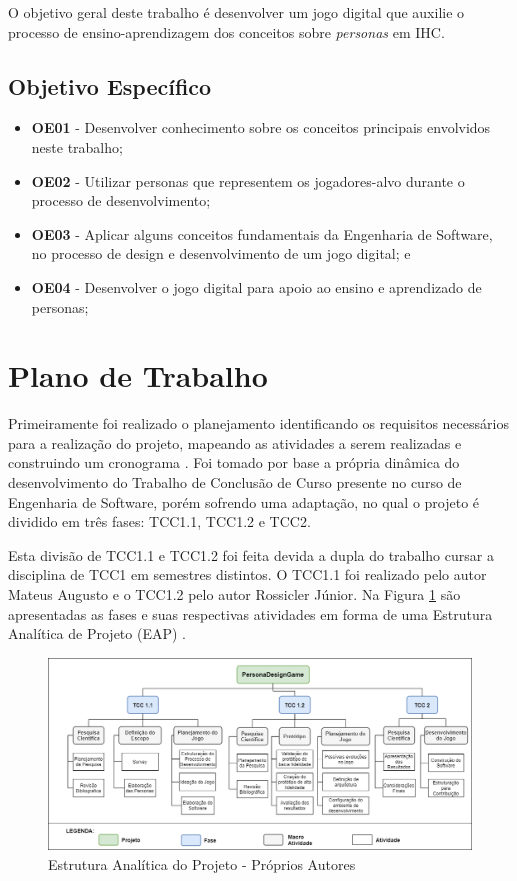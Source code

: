 O objetivo geral deste trabalho é desenvolver um jogo digital que auxilie o processo de ensino-aprendizagem dos conceitos sobre \textit{personas} em IHC.

\subsection{Objetivo Específico}
\label{ssec:obj_especifico}
\begin{itemize}
    \item \textbf{OE01} - Desenvolver conhecimento sobre os conceitos principais envolvidos neste trabalho;
    \item \textbf{OE02} - Utilizar personas que representem os jogadores-alvo durante o processo de desenvolvimento;
    \item \textbf{OE03} - Aplicar alguns conceitos fundamentais da Engenharia de Software, no processo de design e desenvolvimento de um jogo digital; e    
    \item \textbf{OE04} - Desenvolver o jogo digital para apoio ao ensino e aprendizado de personas;
\end{itemize}

\section{Plano de Trabalho}
\label{sec:plano_trab}
{\color{textmodified}
Primeiramente foi realizado o planejamento identificando os requisitos necessários para a realização do projeto, mapeando as atividades a serem realizadas e construindo um cronograma \cite[p. 74]{Pressman_2000}. Foi tomado por base a própria dinâmica do desenvolvimento do Trabalho de Conclusão de Curso presente no curso de Engenharia de Software, porém sofrendo uma adaptação, no qual o projeto é dividido em três fases: TCC1.1, TCC1.2 e TCC2. 

Esta divisão de TCC1.1 e TCC1.2 foi feita devida a dupla do trabalho cursar a disciplina de TCC1 em semestres distintos. O TCC1.1 foi realizado pelo autor Mateus Augusto e o TCC1.2 pelo autor Rossicler Júnior. Na Figura \ref{Fig:eap2.png} são apresentadas as fases e suas respectivas atividades em forma de uma Estrutura Analítica de Projeto (EAP) \cite[p. 112]{pmbok}. %
}

\newpage

\begin{figure}[htbp]
	\centering
		\includegraphics[angle=90,origin=c,keepaspectratio=true,scale=0.5]{figuras/eap2.png}
	\caption{{\color{textadded}Estrutura Analítica do Projeto - Próprios Autores}}
	\label{Fig:eap2.png}
\end{figure}

